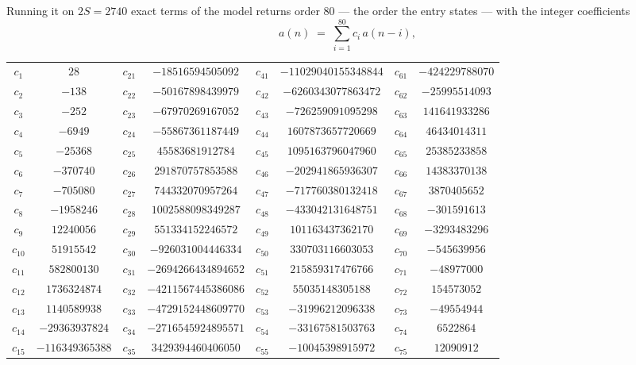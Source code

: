 \documentclass[11pt,a4paper]{article}
\theoremstyle{plain}
\theoremstyle{definition}
\begin{document}
Running it on $2S=2740$ exact terms of the model returns order $80$ --- the order the
entry states --- with the integer coefficients
\[
a(n)\;=\;\sum_{i=1}^{80}c_i\,a(n-i),
\]
\begin{center}\small
\begin{tabular}{cccccccc}
$c_{1}$ & $28$ & $c_{21}$ & $-18516594505092$ & $c_{41}$ & $-11029040155348844$ & $c_{61}$ & $-424229788070$ \\
$c_{2}$ & $-138$ & $c_{22}$ & $-50167898439979$ & $c_{42}$ & $-6260343077863472$ & $c_{62}$ & $-25995514093$ \\
$c_{3}$ & $-252$ & $c_{23}$ & $-67970269167052$ & $c_{43}$ & $-726259091095298$ & $c_{63}$ & $141641933286$ \\
$c_{4}$ & $-6949$ & $c_{24}$ & $-55867361187449$ & $c_{44}$ & $1607873657720669$ & $c_{64}$ & $46434014311$ \\
$c_{5}$ & $-25368$ & $c_{25}$ & $45583681912784$ & $c_{45}$ & $1095163796047960$ & $c_{65}$ & $25385233858$ \\
$c_{6}$ & $-370740$ & $c_{26}$ & $291870757853588$ & $c_{46}$ & $-202941865936307$ & $c_{66}$ & $14383370138$ \\
$c_{7}$ & $-705080$ & $c_{27}$ & $744332070957264$ & $c_{47}$ & $-717760380132418$ & $c_{67}$ & $3870405652$ \\
$c_{8}$ & $-1958246$ & $c_{28}$ & $1002588098349287$ & $c_{48}$ & $-433042131648751$ & $c_{68}$ & $-301591613$ \\
$c_{9}$ & $12240056$ & $c_{29}$ & $551334152246572$ & $c_{49}$ & $101163437362170$ & $c_{69}$ & $-3293483296$ \\
$c_{10}$ & $51915542$ & $c_{30}$ & $-926031004446334$ & $c_{50}$ & $330703116603053$ & $c_{70}$ & $-545639956$ \\
$c_{11}$ & $582800130$ & $c_{31}$ & $-2694266434894652$ & $c_{51}$ & $215859317476766$ & $c_{71}$ & $-48977000$ \\
$c_{12}$ & $1736324874$ & $c_{32}$ & $-4211567445386086$ & $c_{52}$ & $55035148305188$ & $c_{72}$ & $154573052$ \\
$c_{13}$ & $1140589938$ & $c_{33}$ & $-4729152448609770$ & $c_{53}$ & $-31996212096338$ & $c_{73}$ & $-49554944$ \\
$c_{14}$ & $-29363937824$ & $c_{34}$ & $-2716545924895571$ & $c_{54}$ & $-33167581503763$ & $c_{74}$ & $6522864$ \\
$c_{15}$ & $-116349365388$ & $c_{35}$ & $3429394460406050$ & $c_{55}$ & $-10045398915972$ & $c_{75}$ & $12090912$ \\

\end{tabular}
\end{center}
\end{document}
